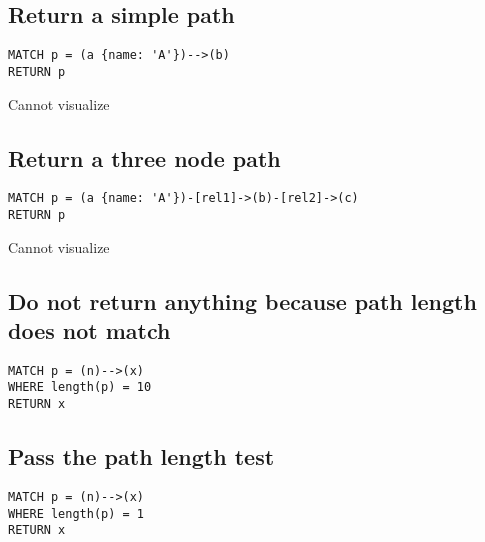 \subsection{Return a simple path}

\begin{lstlisting}
MATCH p = (a {name: 'A'})-->(b)
RETURN p
\end{lstlisting}

Cannot visualize
\subsection{Return a three node path}

\begin{lstlisting}
MATCH p = (a {name: 'A'})-[rel1]->(b)-[rel2]->(c)
RETURN p
\end{lstlisting}

Cannot visualize
\subsection{Do not return anything because path length does not match}

\begin{lstlisting}
MATCH p = (n)-->(x)
WHERE length(p) = 10
RETURN x
\end{lstlisting}

\subsection{Pass the path length test}

\begin{lstlisting}
MATCH p = (n)-->(x)
WHERE length(p) = 1
RETURN x
\end{lstlisting}

